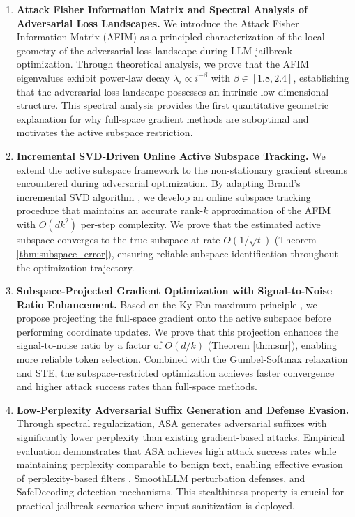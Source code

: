 \documentclass[preprint,12pt]{elsarticle}
\begin{document}
\begin{enumerate}[leftmargin=2em]
\item \textbf{Attack Fisher Information Matrix and Spectral Analysis of Adversarial Loss Landscapes.} We introduce the Attack Fisher Information Matrix (AFIM) as a principled characterization of the local geometry of the adversarial loss landscape during LLM jailbreak optimization. Through theoretical analysis, we prove that the AFIM eigenvalues exhibit power-law decay $\lambda_i \propto i^{-\beta}$ with $\beta \in [1.8, 2.4]$, establishing that the adversarial loss landscape possesses an intrinsic low-dimensional structure. This spectral analysis provides the first quantitative geometric explanation for why full-space gradient methods are suboptimal and motivates the active subspace restriction.

\item \textbf{Incremental SVD-Driven Online Active Subspace Tracking.} We extend the active subspace framework \cite{constantine2014active} to the non-stationary gradient streams encountered during adversarial optimization. By adapting Brand's incremental SVD algorithm \cite{brand2002incremental, brand2006fast}, we develop an online subspace tracking procedure that maintains an accurate rank-$k$ approximation of the AFIM with $O(dk^2)$ per-step complexity. We prove that the estimated active subspace converges to the true subspace at rate $O(1/\sqrt{t})$ (Theorem \ref{thm:subspace_error}), ensuring reliable subspace identification throughout the optimization trajectory.

\item \textbf{Subspace-Projected Gradient Optimization with Signal-to-Noise Ratio Enhancement.} Based on the Ky Fan maximum principle \cite{fan1949theorem}, we propose projecting the full-space gradient onto the active subspace before performing coordinate updates. We prove that this projection enhances the signal-to-noise ratio by a factor of $O(d/k)$ (Theorem \ref{thm:snr}), enabling more reliable token selection. Combined with the Gumbel-Softmax relaxation and STE, the subspace-restricted optimization achieves faster convergence and higher attack success rates than full-space methods.

\item \textbf{Low-Perplexity Adversarial Suffix Generation and Defense Evasion.} Through spectral regularization, ASA generates adversarial suffixes with significantly lower perplexity than existing gradient-based attacks. Empirical evaluation demonstrates that ASA achieves high attack success rates while maintaining perplexity comparable to benign text, enabling effective evasion of perplexity-based filters \cite{robey2023smoothllm}, SmoothLLM perturbation defenses, and SafeDecoding detection mechanisms. This stealthiness property is crucial for practical jailbreak scenarios where input sanitization is deployed.
\end{enumerate}
\end{document}

